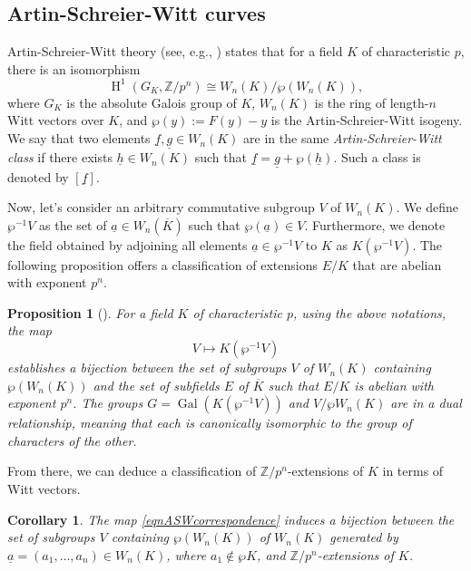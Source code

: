 \documentclass{compositio}
\newtheorem{proposition}[theorem]{Proposition}
\newtheorem{corollary}[theorem]{Corollary}
\theoremstyle{remark}
\theoremstyle{remark}
\DeclareMathOperator{\gal}{Gal}
\DeclareMathOperator{\cohom}{H}
\begin{document}
\subsection{Artin-Schreier-Witt curves}
\label{secASWcurves}

Artin-Schreier-Witt theory (see, e.g., \cite{MR1878556}) states that for a field $K$ of characteristic $p$, there is an isomorphism
\[ \cohom^1(G_K, \mathbb{Z}/p^n) \cong W_n(K)/\wp (W_n(K)),\] 
where $G_K$ is the absolute Galois group of $K$, $W_n(K)$ is the ring of length-$n$ Witt vectors over $K$, and $\wp(y):=F(y)-y$ is the Artin-Schreier-Witt isogeny. We say that two elements $\underline{f}, \underline{g} \in W_n(K)$ are in the same \textit{Artin-Schreier-Witt class} if there exists $\underline{h} \in W_n(K)$ such that $\underline{f}=\underline{g}+\wp(\underline{h})$. Such a class is denoted by $[\underline{f}]$.

Now, let's consider an arbitrary commutative subgroup $V$ of $W_n(K)$. We define $\wp^{-1}V$ as the set of $\underline{a} \in W_n(\overline{K})$ such that $\wp(\underline{a}) \in V$. Furthermore, we denote the field obtained by adjoining all elements $\underline{a}\in \wp^{-1}V$ to $K$ as $K(\wp^{-1}V)$. The following proposition offers a classification of extensions $E/K$ that are abelian with exponent $p^n$.

\begin{proposition}[{\cite[\S 26, Theorem 6]{MR2371763}}]
\label{propabelianpncorrespondence}
For a field $K$ of characteristic $p$, using the above notations, the map
\begin{equation}
\label{eqnASWcorrespondence}
V \mapsto K(\wp^{-1}V)
\end{equation}
establishes a bijection between the set of subgroups $V$ of $W_n(K)$ containing $\wp(W_n(K))$ and the set of subfields $E$ of $\overline{K}$ such that $E/K$ is abelian with exponent $p^n$. The groups $G=\gal(K(\wp^{-1}V))$ and $V/\wp W_n(K)$ are in a dual relationship, meaning that each is canonically isomorphic to the group of characters of the other.
\end{proposition}
From there, we can deduce a classification of $\mathbb{Z}/p^n$-extensions of $K$ in terms of Witt vectors.

\begin{corollary}
\label{coraswcycliccorrespondence}
    The map \eqref{eqnASWcorrespondence} induces a bijection between the set of subgroups $V$ containing $\wp( W_n(K))$ of $W_n(K)$ generated by $\underline{a}=(a_1, \ldots, a_n) \in W_n(K)$, where $a_1 \not\in \wp K$, and $\mathbb{Z}/p^n$-extensions of $K$.  
\end{corollary}
\end{document}
